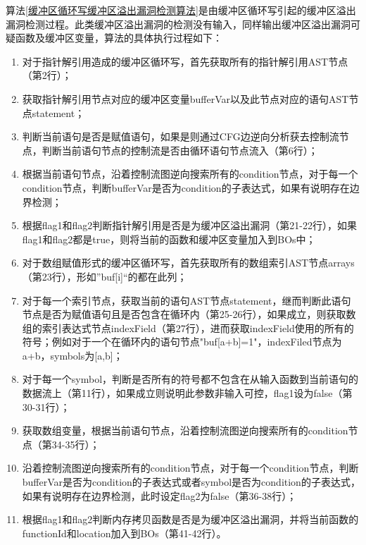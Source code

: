 {算法\ref{缓冲区循环写缓冲区溢出漏洞检测算法}是由缓冲区循环写引起的缓冲区溢出漏洞检测过程。此类缓冲区溢出漏洞的检测没有输入，同样输出缓冲区溢出漏洞可疑函数及缓冲区变量，算法的具体执行过程如下：
\begin{enumerate}[(1)]
\item 对于指针解引用造成的缓冲区循环写，首先获取所有的指针解引用AST节点（第2行）；
\item 获取指针解引用节点对应的缓冲区变量bufferVar以及此节点对应的语句AST节点statement；
\item 判断当前语句是否是赋值语句，如果是则通过CFG边逆向分析获去控制流节点，判断当前语句节点的控制流是否由循环语句节点流入（第6行）；
\item 根据当前语句节点，沿着控制流图逆向搜索所有的condition节点，对于每一个condition节点，判断bufferVar是否为condition的子表达式，如果有说明存在边界检测；
\item 根据flag1和flag2判断指针解引用是否是为缓冲区溢出漏洞（第21-22行），如果flag1和flag2都是true，则将当前的函数和缓冲区变量加入到BOs中；
\item 对于数组赋值形式的缓冲区循环写，首先获取所有的数组索引AST节点arrays（第23行），形如”buf[i]“的都在此列；
\item 对于每一个索引节点，获取当前的语句AST节点statement，继而判断此语句节点是否为赋值语句且是否包含在循环内（第25-26行），如果成立，则获取数组的索引表达式节点indexField（第27行），进而获取indexField使用的所有的符号；例如对于一个在循环内的语句节点"buf[a+b]=1"，indexFiled节点为a+b，symbols为[a,b]；
\item 对于每一个symbol，判断是否所有的符号都不包含在从输入函数到当前语句的数据流上（第11行），如果成立则说明此参数非输入可控，flag1设为false（第30-31行）；
\item 获取数组变量，根据当前语句节点，沿着控制流图逆向搜索所有的condition节点（第34-35行）；
\item 沿着控制流图逆向搜索所有的condition节点，对于每一个condition节点，判断bufferVar是否为condition的子表达式或者symbol是否为condition的子表达式，如果有说明存在边界检测，此时设定flag2为false（第36-38行）；
\item 根据flag1和flag2判断内存拷贝函数是否是为缓冲区溢出漏洞，并将当前函数的functionId和location加入到BOs（第41-42行）。
\end{enumerate}

\begin{breakablealgorithm}
	\renewcommand{\algorithmicrequire}{\textbf{Input:}}
	\renewcommand{\algorithmicensure}{\textbf{Output:}}
	

\end{breakablealgorithm}}
